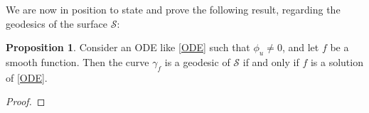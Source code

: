 \documentclass{article}
\theoremstyle{remark}
\theoremstyle{definition}
\newtheorem{proposition}[remark]{Proposition}
\begin{document}
We are now in position to state and prove the following result, regarding the geodesics of the surface $\mathcal{S}$:
\begin{proposition}\label{propGeod}
Consider an ODE like \eqref{ODE} such that $\phi_u\neq 0$, and let $f$ be a smooth function. Then the curve $\gamma_f$ is a geodesic of $\mathcal{S}$ if and only if $f$ is a solution of \eqref{ODE}.
\end{proposition}
\begin{proof}











\end{proof}
\end{document}
